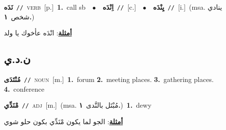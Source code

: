 \documentclass[10pt,a4paper,twoside]{article} %
\begin{document}
\begin{multicols}{2}
{\setlength\topsep{0pt}\textbf{\foreignlanguage{arabic}{نَدَه}}\ {\color{gray}\texttt{//}\color{black}}\ \textsc{verb}\ [p.]\ \textbf{1.}~call sb\ \ $\bullet$\ \ \setlength\topsep{0pt}\textbf{\foreignlanguage{arabic}{اِنْدَه}}\ {\color{gray}\texttt{//}\color{black}}\ [c.]\ \ $\bullet$\ \ \setlength\topsep{0pt}\textbf{\foreignlanguage{arabic}{يِنْدَه}}\ {\color{gray}\texttt{//}\color{black}}\ [i.]\ \color{gray}(msa. \foreignlanguage{arabic}{ينادي شخص}~\foreignlanguage{arabic}{\textbf{١.}})\color{black}\  \begin{flushright}\color{gray}\foreignlanguage{arabic}{\textbf{\underline{\foreignlanguage{arabic}{أمثلة}}}: انْدَه عأخوك يا ولد}\end{flushright}\color{black}} \vspace{2mm}

\vspace{-3mm}
\subsection*{\color{blue}\foreignlanguage{arabic}{ن.د.ي}\color{blue}{}} 

{\setlength\topsep{0pt}\textbf{\foreignlanguage{arabic}{مُنْتَدَى}}\ {\color{gray}\texttt{//}\color{black}}\ \textsc{noun}\ [m.]\ \textbf{1.}~forum  \textbf{2.}~meeting places.  \textbf{3.}~gathering places.  \textbf{4.}~conference\ } \vspace{2mm}

{\setlength\topsep{0pt}\textbf{\foreignlanguage{arabic}{مْنَدِّي}}\ {\color{gray}\texttt{//}\color{black}}\ \textsc{adj}\ [m.]\ \color{gray}(msa. \foreignlanguage{arabic}{مُبْتَل بالنَّدى}~\foreignlanguage{arabic}{\textbf{١.}})\color{black}\ \textbf{1.}~dewy\  \begin{flushright}\color{gray}\foreignlanguage{arabic}{\textbf{\underline{\foreignlanguage{arabic}{أمثلة}}}: الجو لما يكون مْنَدِّي بكون حلو شوي}\end{flushright}\color{black}} \vspace{2mm}


\end{multicols}
\end{document}

